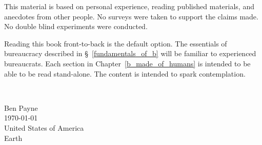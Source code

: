 This material is based on personal experience, reading published materials, and anecdotes from other people. No surveys were taken to support the claims made. No double blind experiments were conducted. 

Reading this book front-to-back is the default option. 
The essentials of bureaucracy described in \S~\ref{fundamentals_of_b} will be familiar to experienced bureaucrats. Each section in Chapter~\ref{b_made_of_humans} is intended to be able to be read stand-alone. The content is intended to spark contemplation. 

\ \\

\begin{flushright}
Ben Payne\\
\today\\
United States of America\\
Earth
\end{flushright}


